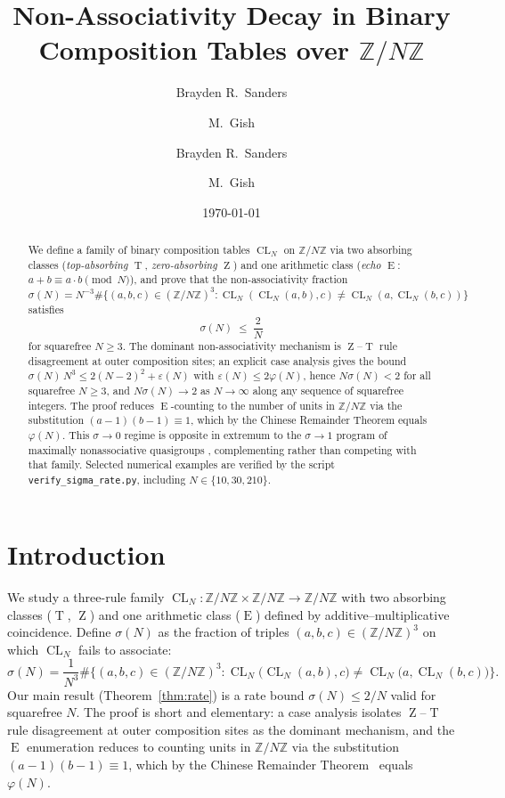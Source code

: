 \documentclass[11pt,reqno]{amsart}
\title[Non-associativity decay on \texorpdfstring{$\mathbb{Z}/N\mathbb{Z}$}{Z/NZ}]%
{Non-Associativity Decay in Binary Composition Tables over
$\mathbb{Z}/N\mathbb{Z}$}
\author{Brayden R.\ Sanders \and M.\ Gish}
\author{Brayden R.\ Sanders \and M.\ Gish}
\date{\today}
\theoremstyle{plain}
\theoremstyle{definition}
\theoremstyle{remark}
\DeclareMathOperator{\CL}{CL}
\DeclareMathOperator{\ECHO}{E}
\DeclareMathOperator{\HARM}{T}
\DeclareMathOperator{\VOID}{Z}
\newcommand{\ZN}{\mathbb{Z}/N\mathbb{Z}}
\begin{document}
\begin{abstract}
We define a family of binary composition tables $\CL_N$ on $\ZN$ via
two absorbing classes (\emph{top-absorbing} $\HARM$, \emph{zero-absorbing}
$\VOID$) and one arithmetic class (\emph{echo} $\ECHO$: $a+b\equiv a\cdot b\pmod N$),
and prove that the non-associativity fraction
$\sigma(N)=N^{-3}\#\{(a,b,c)\in(\ZN)^{3}:\CL_N(\CL_N(a,b),c)\neq\CL_N(a,\CL_N(b,c))\}$
satisfies
\[
  \sigma(N)\;\le\;\frac{2}{N}
\]
for squarefree $N\ge 3$. The dominant non-associativity mechanism is
$\VOID$--$\HARM$ rule disagreement at outer composition sites; an
explicit case analysis gives the bound
$\sigma(N)\,N^{3}\le 2(N-2)^{2}+\varepsilon(N)$ with
$\varepsilon(N)\le 2\varphi(N)$, hence $N\sigma(N)<2$ for all
squarefree $N\ge 3$, and $N\sigma(N)\to 2$ as $N\to\infty$ along
any sequence of squarefree integers. The proof reduces $\ECHO$-counting to
the number of units in $\ZN$ via the substitution
$(a-1)(b-1)\equiv 1$, which by the Chinese Remainder Theorem equals
$\varphi(N)$. This $\sigma\to 0$ regime is opposite in extremum to
the $\sigma\to 1$ program of maximally nonassociative quasigroups
\cite{DrapalWanless2021,DrapalLisonek2020}, complementing rather than
competing with that family. Selected numerical examples
are verified by the script \texttt{verify\_sigma\_rate.py}, including
$N\in\{10,30,210\}$.
\end{abstract}

\maketitle

\section{Introduction}\label{sec:intro}

We study a three-rule family $\CL_N:\ZN\times\ZN\to\ZN$ with two
absorbing classes ($\HARM$, $\VOID$) and one arithmetic class
($\ECHO$) defined by additive--multiplicative coincidence. Define
$\sigma(N)$ as the fraction of triples $(a,b,c)\in(\ZN)^3$ on which
$\CL_N$ fails to associate:
\begin{equation}\label{eq:sigma-def}
  \sigma(N)=\frac{1}{N^{3}}
  \#\Big\{(a,b,c)\in(\ZN)^{3}:
         \CL_N\!\big(\CL_N(a,b),c\big)\neq\CL_N\!\big(a,\CL_N(b,c)\big)\Big\}.
\end{equation}
Our main result (Theorem~\ref{thm:rate}) is a rate bound
$\sigma(N)\le 2/N$ valid for squarefree $N$. The proof is short
and elementary: a case analysis isolates $\VOID$--$\HARM$ rule
disagreement at outer composition sites as the dominant mechanism,
and the $\ECHO$ enumeration reduces to counting units in $\ZN$
via the substitution $(a-1)(b-1)\equiv 1$, which by the Chinese
Remainder Theorem~\cite{Gauss1801,Lang2002} equals $\varphi(N)$.
\end{document}
